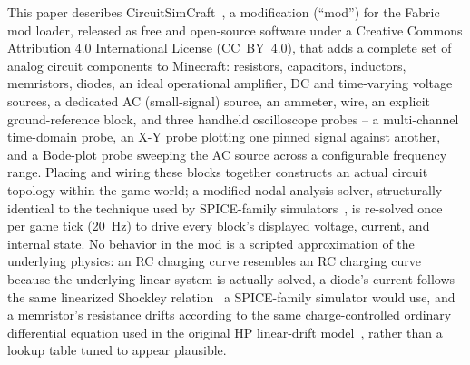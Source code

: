 This paper describes CircuitSimCraft~\cite{picos2026circuitsimcraft}, a modification
(``mod'') for the Fabric mod loader, released as free and open-source software under a
Creative Commons Attribution 4.0 International License (CC~BY~4.0), that adds a complete set
of analog circuit components to Minecraft: resistors,
capacitors, inductors, memristors, diodes, an ideal operational amplifier, DC and
time-varying voltage sources, a dedicated AC (small-signal) source, an ammeter, wire, an
explicit ground-reference block, and three handheld oscilloscope probes -- a multi-channel
time-domain probe, an X-Y probe plotting one pinned signal against another, and a Bode-plot
probe sweeping the AC source across a configurable frequency range. Placing and wiring these blocks
together constructs an actual circuit topology within the game world; a modified nodal
analysis solver, structurally identical to the technique used by SPICE-family
simulators~\cite{ho1975mna}, is re-solved once per game tick (20~Hz) to drive every block's
displayed voltage, current, and internal state. No behavior in the mod is a scripted
approximation of the underlying physics: an RC charging curve resembles an RC charging curve
because the underlying linear system is actually solved, a diode's current follows the same
linearized Shockley relation~\cite{shockley1949diode} a SPICE-family simulator would use, and
a memristor's resistance drifts according to the same charge-controlled ordinary differential
equation used in the original HP linear-drift model~\cite{strukov2008missing}, rather than a
lookup table tuned to appear plausible.

